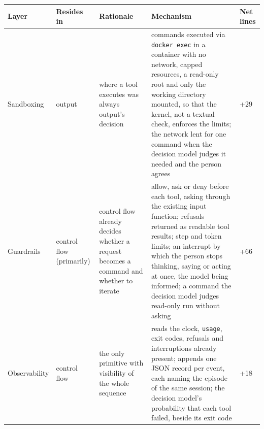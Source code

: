 {\def\LTcaptype{none} 
\begin{longtable}[]{@{}
  >{\raggedright\arraybackslash}p{}
  >{\raggedright\arraybackslash}p{}
  >{\raggedright\arraybackslash}p{}
  >{\raggedright\arraybackslash}p{}
  >{\raggedright\arraybackslash}p{}@{}}
\toprule\noalign{}
\begin{minipage}[b]{\linewidth}\raggedright
Layer
\end{minipage} & \begin{minipage}[b]{\linewidth}\raggedright
Resides in
\end{minipage} & \begin{minipage}[b]{\linewidth}\raggedright
Rationale
\end{minipage} & \begin{minipage}[b]{\linewidth}\raggedright
Mechanism
\end{minipage} & \begin{minipage}[b]{\linewidth}\raggedright
Net lines
\end{minipage} \\
\midrule\noalign{}
\endhead
\bottomrule\noalign{}
\endlastfoot
Sandboxing & output & where a tool executes was always output's decision & commands executed via \passthrough{\lstinline!docker exec!} in a container with no network, capped resources, a read-only root and only the working directory mounted, so that the kernel, not a textual check, enforces the limits; the network lent for one command when the decision model judges it needed and the person agrees & +29 \\
Guardrails & control flow (primarily) & control flow already decides whether a request becomes a command and whether to iterate & allow, ask or deny before each tool, asking through the existing input function; refusals returned as readable tool results; step and token limits; an interrupt by which the person stops thinking, saying or acting at once, the model being informed; a command the decision model judges read-only run without asking & +66 \\
Observability & control flow & the only primitive with visibility of the whole sequence & reads the clock, \passthrough{\lstinline!usage!}, exit codes, refusals and interruptions already present; appends one JSON record per event, each naming the episode of the same session; the decision model's probability that each tool failed, beside its exit code & +18 \\

\end{longtable}}
